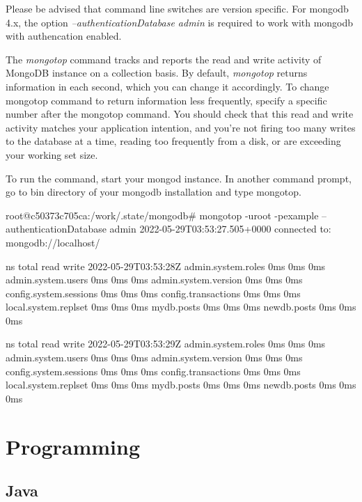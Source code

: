 \documentclass[12pt]{article}
\begin{document}
\begin{bashcode}
\begin{bashcode}
Please be advised that command line switches are version specific. 
For mongodb 4.x, the option \emph{--authenticationDatabase admin} is
required to work with mongodb with authencation enabled.


The \emph{mongotop} command tracks and reports the read and write
activity of MongoDB instance on a collection basis. By default,
\emph{mongotop} returns information in each second, which you can change
it accordingly. To change mongotop command to return information less
frequently, specify a specific number after the mongotop command. You
should check that this read and write activity matches your application
intention, and you’re not firing too many writes to the database at a
time, reading too frequently from a disk, or are exceeding your working
set size.

To run the command, start your mongod instance. In another command
prompt, go to bin directory of your mongodb installation and type
mongotop.


\begin{bashcode}
root@c50373c705ca:/work/.state/mongodb# mongotop -uroot -pexample --authenticationDatabase admin
2022-05-29T03:53:27.505+0000    connected to: mongodb://localhost/

                    ns    total    read    write    2022-05-29T03:53:28Z
    admin.system.roles      0ms     0ms      0ms
    admin.system.users      0ms     0ms      0ms
  admin.system.version      0ms     0ms      0ms
config.system.sessions      0ms     0ms      0ms
   config.transactions      0ms     0ms      0ms
  local.system.replset      0ms     0ms      0ms
            mydb.posts      0ms     0ms      0ms
           newdb.posts      0ms     0ms      0ms

                    ns    total    read    write    2022-05-29T03:53:29Z
    admin.system.roles      0ms     0ms      0ms
    admin.system.users      0ms     0ms      0ms
  admin.system.version      0ms     0ms      0ms
config.system.sessions      0ms     0ms      0ms
   config.transactions      0ms     0ms      0ms
  local.system.replset      0ms     0ms      0ms
            mydb.posts      0ms     0ms      0ms
           newdb.posts      0ms     0ms      0ms
\end{bashcode}

\newpage
\section{Programming}
\subsection{Java}

\end{bashcode}
\end{bashcode}
\end{document}
